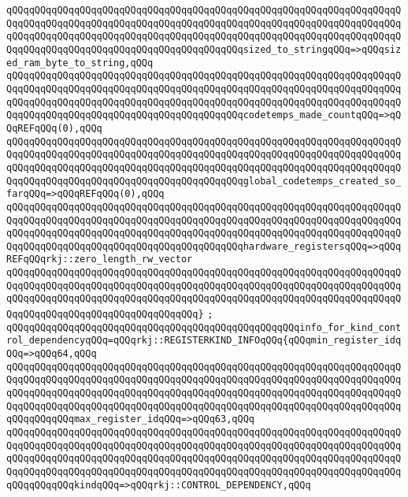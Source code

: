 \verb|qQQqqQQqqQQqqQQqqQQqqQQqqQQqqQQqqQQqqQQqqQQqqQQqqQQqqQQqqQQqqQQqqQQqqQQqqQQqqQQqqQQqqQQqqQQqqQQqqQQqqQQqqQQqqQQqqQQqqQQqqQQqqQQqqQQqqQQqqQQqqQQqqQQqqQQqqQQqqQQqqQQqqQQqqQQqqQQqqQQqqQQqqQQqqQQqqQQqqQQqqQQqqQQqqQQqqQQqqQQqqQQqqQQqqQQqqQQqqQQqqQQqqQQqqQQqsized_to_stringqQQq=>qQQqsized_ram_byte_to_string,qQQq|\newline
\verb|qQQqqQQqqQQqqQQqqQQqqQQqqQQqqQQqqQQqqQQqqQQqqQQqqQQqqQQqqQQqqQQqqQQqqQQqqQQqqQQqqQQqqQQqqQQqqQQqqQQqqQQqqQQqqQQqqQQqqQQqqQQqqQQqqQQqqQQqqQQqqQQqqQQqqQQqqQQqqQQqqQQqqQQqqQQqqQQqqQQqqQQqqQQqqQQqqQQqqQQqqQQqqQQqqQQqqQQqqQQqqQQqqQQqqQQqqQQqqQQqqQQqqQQqqQQqcodetemps_made_countqQQq=>qQQqREFqQQq(0),qQQq|\newline
\verb|qQQqqQQqqQQqqQQqqQQqqQQqqQQqqQQqqQQqqQQqqQQqqQQqqQQqqQQqqQQqqQQqqQQqqQQqqQQqqQQqqQQqqQQqqQQqqQQqqQQqqQQqqQQqqQQqqQQqqQQqqQQqqQQqqQQqqQQqqQQqqQQqqQQqqQQqqQQqqQQqqQQqqQQqqQQqqQQqqQQqqQQqqQQqqQQqqQQqqQQqqQQqqQQqqQQqqQQqqQQqqQQqqQQqqQQqqQQqqQQqqQQqqQQqqQQqglobal_codetemps_created_so_farqQQq=>qQQqREFqQQq(0),qQQq|\newline
\verb|qQQqqQQqqQQqqQQqqQQqqQQqqQQqqQQqqQQqqQQqqQQqqQQqqQQqqQQqqQQqqQQqqQQqqQQqqQQqqQQqqQQqqQQqqQQqqQQqqQQqqQQqqQQqqQQqqQQqqQQqqQQqqQQqqQQqqQQqqQQqqQQqqQQqqQQqqQQqqQQqqQQqqQQqqQQqqQQqqQQqqQQqqQQqqQQqqQQqqQQqqQQqqQQqqQQqqQQqqQQqqQQqqQQqqQQqqQQqqQQqqQQqqQQqqQQqhardware_registersqQQq=>qQQqREFqQQqrkj::zero_length_rw_vector|\newline
\verb|qQQqqQQqqQQqqQQqqQQqqQQqqQQqqQQqqQQqqQQqqQQqqQQqqQQqqQQqqQQqqQQqqQQqqQQqqQQqqQQqqQQqqQQqqQQqqQQqqQQqqQQqqQQqqQQqqQQqqQQqqQQqqQQqqQQqqQQqqQQqqQQqqQQqqQQqqQQqqQQqqQQqqQQqqQQqqQQqqQQqqQQqqQQqqQQqqQQqqQQqqQQqqQQqqQQqqQQqqQQqqQQqqQQqqQQqqQQqqQQqqQQq}|\newline
\verb|;|\newline
\verb|qQQqqQQqqQQqqQQqqQQqqQQqqQQqqQQqqQQqqQQqqQQqqQQqqQQqinfo_for_kind_control_dependencyqQQq=qQQqrkj::REGISTERKIND_INFOqQQq{qQQqmin_register_idqQQq=>qQQq64,qQQq|\newline
\verb|qQQqqQQqqQQqqQQqqQQqqQQqqQQqqQQqqQQqqQQqqQQqqQQqqQQqqQQqqQQqqQQqqQQqqQQqqQQqqQQqqQQqqQQqqQQqqQQqqQQqqQQqqQQqqQQqqQQqqQQqqQQqqQQqqQQqqQQqqQQqqQQqqQQqqQQqqQQqqQQqqQQqqQQqqQQqqQQqqQQqqQQqqQQqqQQqqQQqqQQqqQQqqQQqqQQqqQQqqQQqqQQqqQQqqQQqqQQqqQQqqQQqqQQqqQQqqQQqqQQqqQQqqQQqqQQqqQQqqQQqqQQqqQQqqQQqmax_register_idqQQq=>qQQq63,qQQq|\newline
\verb|qQQqqQQqqQQqqQQqqQQqqQQqqQQqqQQqqQQqqQQqqQQqqQQqqQQqqQQqqQQqqQQqqQQqqQQqqQQqqQQqqQQqqQQqqQQqqQQqqQQqqQQqqQQqqQQqqQQqqQQqqQQqqQQqqQQqqQQqqQQqqQQqqQQqqQQqqQQqqQQqqQQqqQQqqQQqqQQqqQQqqQQqqQQqqQQqqQQqqQQqqQQqqQQqqQQqqQQqqQQqqQQqqQQqqQQqqQQqqQQqqQQqqQQqqQQqqQQqqQQqqQQqqQQqqQQqqQQqqQQqqQQqqQQqqQQqkindqQQq=>qQQqrkj::CONTROL_DEPENDENCY,qQQq|\newline
